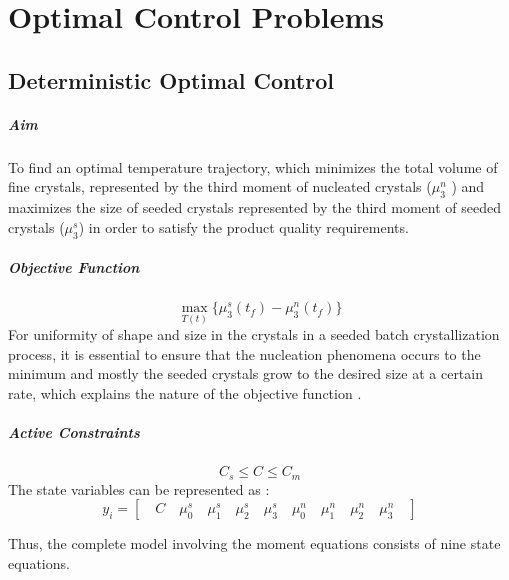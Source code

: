 \chapter{Optimal Control Problems}

\section{Deterministic Optimal Control}


\paragraph{Aim}
To find an optimal temperature trajectory, which minimizes the total volume of fine crystals, represented by the third moment of nucleated crystals ($\mu_{3}^{n}$ ) and maximizes the size of seeded crystals represented by the third moment of seeded crystals ($\mu_{3}^{s}$) in order to satisfy the product quality requirements.

\paragraph{Objective Function}
\begin{equation*}
\max_{T(t)}\lbrace{\mu_{3}^{s}(t_{f}) - \mu_{3}^{n}(t_{f})\rbrace } 
\end{equation*}
For uniformity of shape and size in the crystals in a seeded batch crystallization process, it is essential to ensure that the nucleation phenomena occurs to the minimum and mostly the seeded crystals grow to the desired size at a certain rate, which explains the nature of the objective function .

\paragraph{Active Constraints}
\begin{equation*}
C_{s}\leqslant C \leqslant C_{m}
\end{equation*}
The state variables can be represented as :
\begin{equation*}
y_{i} = \left[\quad C \quad \mu_{0}^{s} \quad \mu_{1}^{s}\quad \mu_{2}^{s}\quad \mu_{3}^{s}\quad \mu_{0}^{n}\quad \mu_{1}^{n}\quad \mu_{2}^{n}\quad \mu_{3}^{n}\quad\right]  
\end{equation*}

Thus, the complete model involving the moment equations consists of nine state equations. 

